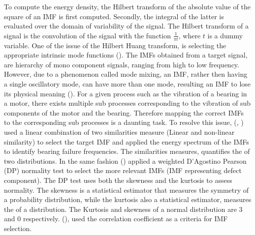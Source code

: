 \documentclass[../Main/thesis.tex]{subfiles}
\begin{document}
To compute the energy density, the Hilbert transform of the absolute value of the square of an IMF is first computed. Secondly, the integral of the latter is evaluated over the domain of variability of the signal. The Hilbert transform of a signal is the convolution of the signal with the function $\frac{1}{\pi t}$, where $t$ is a dummy variable.
\justify
One of the issue of the Hilbert Huang transform, is selecting the appropriate intrinsic mode functions (\cite{fosso2019}). The IMFs obtained from a target signal, are hierarchy of mono component signals, ranging from high to low frequency. However, due to a phenomenon called mode mixing, an IMF, rather then having a single oscillatory mode, can have more than one mode, resulting an IMF to lose its physical meaning (\cite{fosso2019}). For a given process such as the vibration of a bearing in a motor, there exists multiple sub processes corresponding to the vibration of sub components of the motor and the bearing. Therefore mapping the correct IMFs to the corresponding sub processes is a daunting task.
\justify
 To resolve this issue, (\cite{osman2013a}, \cite{osman2013b} ) used a linear combination of two similarities measure (Linear and non-linear similarity) to select the target IMF and applied the energy spectrum of the IMFs to identify bearing failure frequencies. The similarities measures, quantifies the  of two distributions.
In the same fashion (\cite{osman2014}) applied a weighted D'Agostino Pearson (DP) normality test to select the more relevant IMFs (IMF representing defect component). The DP test uses both the skewness and the kurtosis to assess normality.
The skewness is a statistical estimator that measures the symmetry of a probability distribution, while the kurtosis also a statistical estimator, measures the  of a distribution. The Kurtosis and skewness of a normal distribution are 3 and 0 respectively. (\cite{peng2004}), used the correlation coefficient as a criteria for IMF selection.
\justify

 




\end{document}
